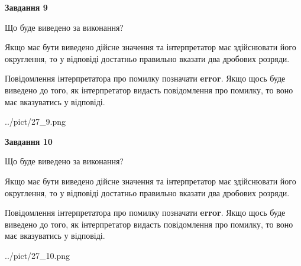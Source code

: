 \documentclass[12pt, ukrainian]{article}
\begin{document}
{\begin {Large}
{\begin {center}\textbf{Завдання 9}\end {center}}\par
Що буде виведено за виконання? \par

Якщо має бути виведено дійсне значення та інтерпретатор має здійснювати його округлення, 
то у відповіді достатньо правильно вказати два дробових розряди.

Повідомлення інтерпретатора про помилку позначати \textbf{error}.
Якщо щось буде виведено до того, як інтерпретатор видасть повідомлення про помилку, 
то воно має вказуватись у відповіді. \par

\begin{center}
	{../pict/27_9.png}
\end{center}
\newpage

{\begin {center}\textbf{Завдання 10}\end {center}}\par
Що буде виведено за виконання? \par

Якщо має бути виведено дійсне значення та інтерпретатор має здійснювати його округлення, 
то у відповіді достатньо правильно вказати два дробових розряди.

Повідомлення інтерпретатора про помилку позначати \textbf{error}.
Якщо щось буде виведено до того, як інтерпретатор видасть повідомлення про помилку, 
то воно має вказуватись у відповіді. \par

\begin{center}
	{../pict/27_10.png}
\end{center}
\newpage

\end {Large}}
\end{document}
